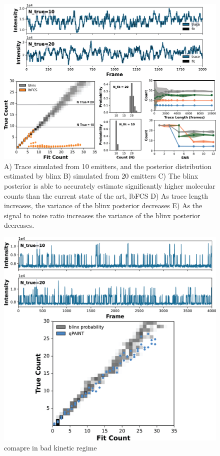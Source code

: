 \documentclass[twocolumn]{article}
\begin{document}
\begin{figure}
  \includegraphics[width=\linewidth]{figures/simulated_counting.png}
  \caption{A) Trace simulated from 10 emitters, and the posterior distribution estimated by blinx B) simulated from 20 emitters
  C) The blinx posterior is able to accurately estimate significantly higher molecular counts than the current state of the art, lbFCS
  D) As trace length increases, the variance of the blinx posterior decreases E) As the signal to noise ratio increases the variance of 
  the blinx posterior decreases. }
  \label{fig:method:overview}
\end{figure}

\begin{figure}
  \includegraphics[width=\linewidth]{figures/qpaint_kinetics.png}
  \caption{comapre in bad kinetic regime}
  \label{fig:method:overview}
\end{figure}
\end{document}
